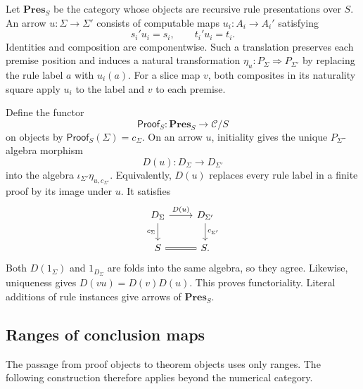 \documentclass[11pt]{article}
\theoremstyle{definition}
\theoremstyle{remark}
\begin{document}
Let $\mathbf{Pres}_S$ be the category whose objects are recursive rule
presentations over $S$. An arrow $u:\Sigma\to\Sigma'$ consists of
computable maps $u_i:A_i\to A_i'$ satisfying
\[
 s_i'u_i=s_i,\qquad t_i'u_i=t_i.
\]
Identities and composition are componentwise. Such a translation
preserves each premise position and induces a natural transformation
$\eta_u:P_\Sigma\Rightarrow P_{\Sigma'}$ by replacing the rule label
$a$ with $u_i(a)$. For a slice map $v$, both composites in its
naturality square apply $u_i$ to the label and $v$ to each premise.

Define the functor
\[
 \mathsf{Proof}_S:\mathbf{Pres}_S\longrightarrow\mathscr C/S
\]
on objects by $\mathsf{Proof}_S(\Sigma)=c_\Sigma$. On an arrow $u$,
initiality gives the unique $P_\Sigma$-algebra morphism
\[
 D(u):D_\Sigma\longrightarrow D_{\Sigma'}
\]
into the algebra
$\iota_{\Sigma'}\eta_{u,c_{\Sigma'}}$. Equivalently, $D(u)$ replaces
every rule label in a finite proof by its image under $u$. It satisfies
\[
 \begin{tikzcd}
 D_\Sigma\arrow[r,"D(u)"]\arrow[d,"c_\Sigma"']
   &D_{\Sigma'}\arrow[d,"c_{\Sigma'}"]\\
 S\arrow[r,equal]&S.
 \end{tikzcd}
\]
Both $D(1_\Sigma)$ and $1_{D_\Sigma}$ are folds into the same algebra,
so they agree. Likewise, uniqueness gives $D(vu)=D(v)D(u)$.
This proves functoriality. Literal additions of rule instances give
arrows of $\mathbf{Pres}_S$.

\subsection{Ranges of conclusion maps}\label{poly:ranges}

The passage from proof objects to theorem objects uses only ranges.
The following construction therefore applies beyond the numerical
category.
\end{document}
